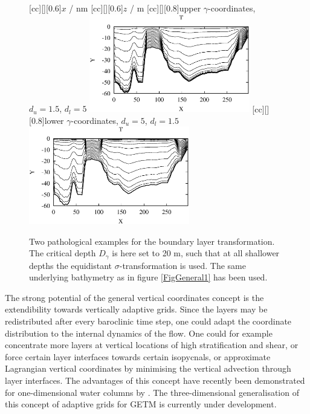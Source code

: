 \begin{figure}
\begin{center}
[cc][][0.6]{$x$ / nm}
[cc][][0.6]{$z$ / m}
[cc][][0.8]{upper $\gamma$-coordinates, $d_u=1.5$, $d_l=5$}
\includegraphics[width=7cm,bbllx=50,bblly=50,bburx=529,bbury=346]{./figures/gammapathoup.ps}
[cc][][0.8]{lower $\gamma$-coordinates, $d_u=5$, $d_l=1.5$}
\includegraphics[width=7cm,bbllx=50,bblly=50,bburx=529,bbury=346]{./figures/gammapatholow.ps}
\caption{
Two pathological examples for the 
boundary layer transformation.
The critical depth $D_{\gamma}$ is here set to 20 m,
such that at all shallower depths the equidistant $\sigma$-transformation
is used.
The same underlying bathymetry as in figure \ref{FigGeneral1} 
has been used. 
}\label{FigGeneral4}
\end{center}
\end{figure}

The strong potential of the general vertical coordinates concept is the 
extendibility towards vertically adaptive grids. Since the layers
may be redistributed after every baroclinic time step, one could adapt the
coordinate distribution to the internal dynamics of the flow. One could
for example concentrate more layers at vertical locations of high
stratification and shear, or force certain layer interfaces towards
certain isopycnals, or approximate Lagrangian vertical coordinates by
minimising the vertical advection through layer interfaces. The advantages
of this concept have recently been demonstrated for one-dimensional water
columns by \cite{BURCHARDea04}. The three-dimensional generalisation
of this concept of adaptive grids for GETM is currently under
development.

